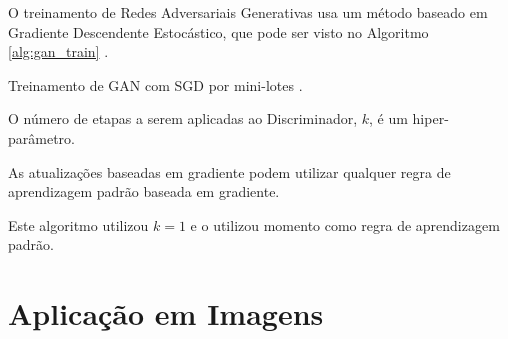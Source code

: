 O treinamento de Redes Adversariais Generativas usa um método baseado em Gradiente Descendente Estocástico, que pode ser visto no Algoritmo \ref{alg:gan_train} \citep{NIPS2014_5423}.


\begin{algorithm}
\caption{Treinamento de GAN com SGD por mini-lotes \citep{NIPS2014_5423}.}
\label{alg:gan_train}
\begin{algorithmic}[1]



    \EndFor


\EndFor

\noindent O número de etapas a serem aplicadas ao Discriminador, $k$, é um hiper-parâmetro.

\noindent As atualizações baseadas em gradiente podem utilizar qualquer regra de aprendizagem padrão baseada em gradiente.

\noindent Este algoritmo utilizou $k = 1$ e o utilizou momento como regra de aprendizagem padrão.

\end{algorithmic}
\end{algorithm}




\section{Aplicação em Imagens}
\label{sec:gan_applications_to_images}

